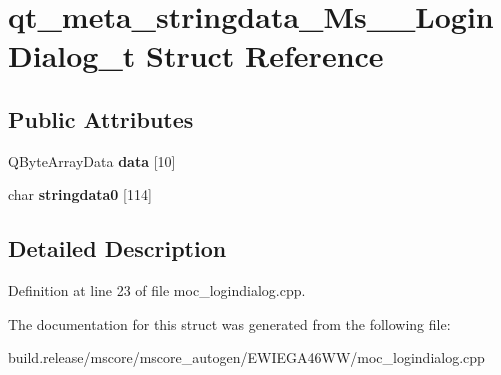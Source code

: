 \hypertarget{structqt__meta__stringdata___ms_____login_dialog__t}{}\section{qt\+\_\+meta\+\_\+stringdata\+\_\+\+Ms\+\_\+\+\_\+\+Login\+Dialog\+\_\+t Struct Reference}
\label{structqt__meta__stringdata___ms_____login_dialog__t}
\subsection*{Public Attributes}
\begin{DoxyCompactItemize}
\item 
\mbox{\label{structqt__meta__stringdata___ms_____login_dialog__t_a6fe51d5e80e8b18d84d8fbdf01ae665f}} 
Q\+Byte\+Array\+Data {\bfseries data} \mbox{[}10\mbox{]}
\item 
\mbox{\label{structqt__meta__stringdata___ms_____login_dialog__t_a3effc39f51c23e3c3782b3dc0eab3db7}} 
char {\bfseries stringdata0} \mbox{[}114\mbox{]}
\end{DoxyCompactItemize}


\subsection{Detailed Description}


Definition at line 23 of file moc\+\_\+logindialog.\+cpp.



The documentation for this struct was generated from the following file\+:\begin{DoxyCompactItemize}
\item 
build.\+release/mscore/mscore\+\_\+autogen/\+E\+W\+I\+E\+G\+A46\+W\+W/moc\+\_\+logindialog.\+cpp\end{DoxyCompactItemize}
